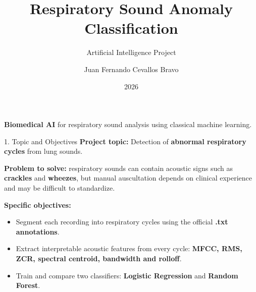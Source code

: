 \documentclass[aspectratio=169]{beamer}
\title{Respiratory Sound Anomaly Classification}
\subtitle{Artificial Intelligence Project}
\author{Juan Fernando Cevallos Bravo}
\institute{Yachay Tech University}
\date{2026}
\newcommand{\important}[1]{\textcolor{YachayBlue}{\textbf{#1}}}
\begin{document}
\begin{frame}
  \titlepage
  \vspace{-0.2cm}
  \centering
  \important{Biomedical AI} for respiratory sound analysis using classical machine learning.
\end{frame}

\begin{frame}{1. Topic and Objectives}
\textbf{Project topic:} Detection of \important{abnormal respiratory cycles} from lung sounds.

\vspace{0.35cm}
\textbf{Problem to solve:} respiratory sounds can contain acoustic signs such as \important{crackles} and \important{wheezes}, but manual auscultation depends on clinical experience and may be difficult to standardize.

\vspace{0.35cm}
\textbf{Specific objectives:}
\begin{itemize}
    \item Segment each recording into respiratory cycles using the official \important{.txt annotations}.
    \item Extract interpretable acoustic features from every cycle: \important{MFCC, RMS, ZCR, spectral centroid, bandwidth and rolloff}.
    \item Train and compare two classifiers: \important{Logistic Regression} and \important{Random Forest}.
\end{itemize}
\end{frame}
\end{document}

